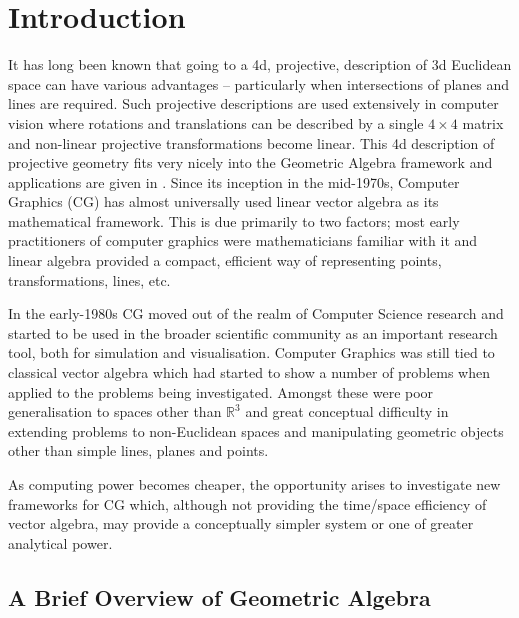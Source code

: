 \begin{savequote}
\end{savequote}

\chapter{Introduction}

It has long been known that going to a 4d, projective, description
of 3d Euclidean space can have various advantages -- particularly
when intersections of planes and lines are required. Such
projective descriptions are used extensively in computer vision
where rotations and translations can be described by a single
$4\times 4$ matrix and non-linear projective transformations
become linear. This 4d description of projective geometry fits
very nicely into the Geometric Algebra framework and applications
are given in \cite{HZ91,IJPR00}. 
Since its inception in the mid-1970s, Computer Graphics (CG) has almost
universally used linear vector algebra as its mathematical framework.
This is due primarily to two factors; most early practitioners of
computer graphics were mathematicians familiar with it and 
linear algebra provided a compact, efficient way of representing points, 
transformations, lines, etc.

In the early-1980s CG moved out of the realm of Computer
Science research and started to be used in the broader scientific 
community as an important research tool, both for simulation and visualisation.
Computer Graphics was still tied to classical vector algebra which
had started to show a number of problems when applied to the problems
being investigated. Amongst these were poor generalisation to
spaces other than $\mathbb{R}^3$ and great conceptual difficulty 
in extending problems to non-Euclidean spaces and
manipulating geometric objects other than simple lines, planes and points.

As computing power becomes cheaper, the opportunity
arises to investigate new
frameworks for CG which, although not providing the time/space
efficiency of vector algebra, may provide a conceptually simpler
system or one of greater analytical power.

\section{A Brief Overview of Geometric Algebra}


